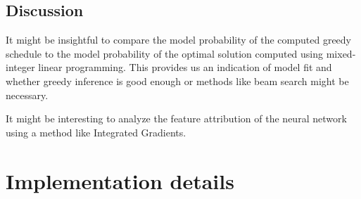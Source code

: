 \documentclass[a4paper]{article}
\theoremstyle{definition}
\theoremstyle{plain}
\begin{document}
\subsection*{Discussion}

It might be insightful to compare the model probability of the computed greedy
schedule to the model probability of the optimal solution computed using
mixed-integer linear programming. This provides us an indication of model fit
and whether greedy inference is good enough or methods like beam search might be
necessary.

It might be interesting to analyze the feature attribution of the neural network
using a method like Integrated Gradients.

%


%

\newpage

\section*{Implementation details}
\end{document}
